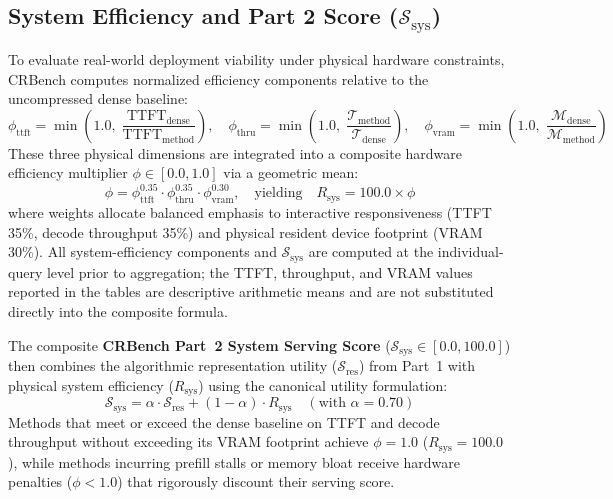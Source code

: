 \documentclass[10pt]{article}
\theoremstyle{definition}
\begin{document}
\subsection{System Efficiency and Part 2 Score (\texorpdfstring{$\mathcal{S}_{\text{sys}}$}{S\_sys})}
To evaluate real-world deployment viability under physical hardware constraints, CRBench computes normalized efficiency components relative to the uncompressed dense baseline:
\begin{equation}
\label{eq:relative_efficiency}
\phi_{\text{ttft}} = \min\left(1.0, \; \frac{\text{TTFT}_{\text{dense}}}{\text{TTFT}_{\text{method}}}\right), \quad
\phi_{\text{thru}} = \min\left(1.0, \; \frac{\mathcal{T}_{\text{method}}}{\mathcal{T}_{\text{dense}}}\right), \quad
\phi_{\text{vram}} = \min\left(1.0, \; \frac{\mathcal{M}_{\text{dense}}}{\mathcal{M}_{\text{method}}}\right)
\end{equation}
These three physical dimensions are integrated into a composite hardware efficiency multiplier $\phi \in [0.0, 1.0]$ via a geometric mean:
\begin{equation}
\label{eq:phi_factor}
\phi = \phi_{\text{ttft}}^{0.35} \cdot \phi_{\text{thru}}^{0.35} \cdot \phi_{\text{vram}}^{0.30}, \quad \text{yielding} \quad R_{\text{sys}} = 100.0 \times \phi
\end{equation}
where weights allocate balanced emphasis to interactive responsiveness (TTFT 35\%, decode throughput 35\%) and physical resident device footprint (VRAM 30\%). All system-efficiency components and $\mathcal{S}_{\text{sys}}$ are computed at the individual-query level prior to aggregation; the TTFT, throughput, and VRAM values reported in the tables are descriptive arithmetic means and are not substituted directly into the composite formula.

The composite \textbf{CRBench Part~2 System Serving Score} ($\mathcal{S}_{\text{sys}} \in [0.0, 100.0]$) then combines the algorithmic representation utility ($\mathcal{S}_{\text{res}}$) from Part~1 with physical system efficiency ($R_{\text{sys}}$) using the canonical utility formulation:
\begin{equation}
\label{eq:part2_score}
\mathcal{S}_{\text{sys}} = \alpha \cdot \mathcal{S}_{\text{res}} + (1 - \alpha) \cdot R_{\text{sys}} \quad (\text{with } \alpha = 0.70)
\end{equation}
Methods that meet or exceed the dense baseline on TTFT and decode throughput without exceeding its VRAM footprint achieve $\phi = 1.0$ ($R_{\text{sys}} = 100.0$), while methods incurring prefill stalls or memory bloat receive hardware penalties ($\phi < 1.0$) that rigorously discount their serving score.
\end{document}
